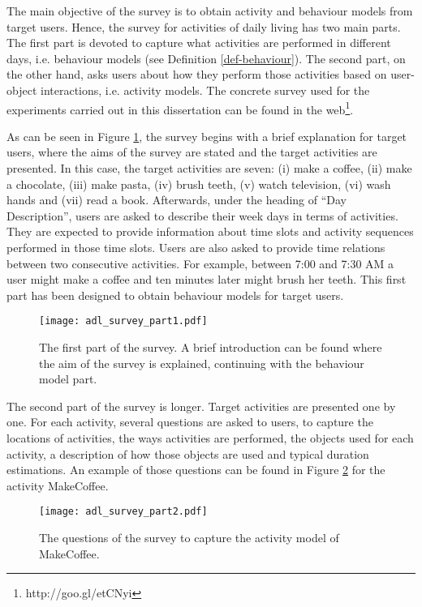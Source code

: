 The main objective of the survey is to obtain activity and behaviour models from target users. Hence, the survey for activities of daily living has two main parts. The first part is devoted to capture what activities are performed in different days, i.e. behaviour models (see Definition \ref{def-behaviour}). The second part, on the other hand, asks users about how they perform those activities based on user-object interactions, i.e. activity models. The concrete survey used for the experiments carried out in this dissertation can be found in the web\footnote{http://goo.gl/etCNyi}. 

As can be seen in Figure \ref{fig-survey-1}, the survey begins with a brief explanation for target users, where the aims of the survey are stated and the target activities are presented. In this case, the target activities are seven: (i) make a coffee, (ii) make a chocolate, (iii) make pasta, (iv) brush teeth, (v) watch television, (vi) wash hands and (vii) read a book. Afterwards, under the heading of ``Day Description'', users are asked to describe their week days in terms of activities. They are expected to provide information about time slots and activity sequences performed in those time slots. Users are also asked to provide time relations between two consecutive activities. For example, between 7:00 and 7:30 AM a user might make a coffee and ten minutes later might brush her teeth. This first part has been designed to obtain behaviour models for target users.

\begin{figure}[htbp]
\centering
\texttt{[image: adl\_survey\_part1.pdf]}
    \caption{The first part of the survey. A brief introduction can be found where the aim of the survey is explained, continuing with the behaviour model part.}
    \label{fig-survey-1}
\end{figure}

The second part of the survey is longer. Target activities are presented one by one. For each activity, several questions are asked to users, to capture the locations of activities, the ways activities are performed, the objects used for each activity, a description of how those objects are used and typical duration estimations. An example of those questions can be found in Figure \ref{fig-survey-2} for the activity MakeCoffee.

\begin{figure}[htbp]
\centering
\texttt{[image: adl\_survey\_part2.pdf]}
    \caption{The questions of the survey to capture the activity model of MakeCoffee.}
    \label{fig-survey-2}
\end{figure}

